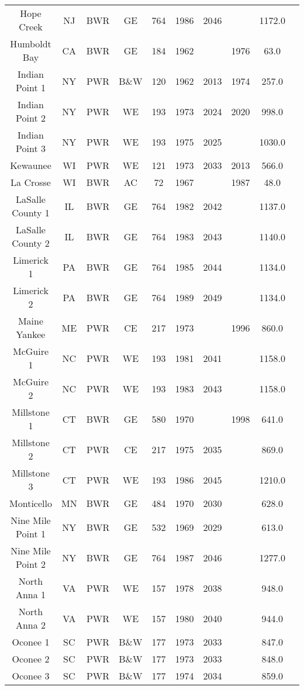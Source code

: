 \begin{table}[h!]
\begin{tabular}{c c c c c c c c c c}
    Hope Creek & NJ & BWR & GE & 764 & 1986 & 2046 &  & 1172.0 \\
    Humboldt Bay & CA & BWR & GE & 184 & 1962 &  & 1976 & 63.0 \\
    Indian Point 1 & NY & PWR & B\&W & 120 & 1962 & 2013 & 1974 & 257.0 \\
    Indian Point 2 & NY & PWR & WE & 193 & 1973 & 2024 & 2020 & 998.0 \\
    Indian Point 3 & NY & PWR & WE & 193 & 1975 & 2025 &  & 1030.0 \\
    Kewaunee & WI & PWR & WE & 121 & 1973 & 2033 & 2013 & 566.0 \\
    La Crosse & WI & BWR & AC & 72 & 1967 &  & 1987 & 48.0 \\
    LaSalle County 1 & IL & BWR & GE & 764 & 1982 & 2042 &  & 1137.0 \\
    LaSalle County 2 & IL & BWR & GE & 764 & 1983 & 2043 &  & 1140.0 \\
    Limerick 1 & PA & BWR & GE & 764 & 1985 & 2044 &  & 1134.0 \\
    Limerick 2 & PA & BWR & GE & 764 & 1989 & 2049 &  & 1134.0 \\
    Maine Yankee & ME & PWR & CE & 217 & 1973 &  & 1996 & 860.0 \\
    McGuire 1 & NC & PWR & WE & 193 & 1981 & 2041 &  & 1158.0 \\
    McGuire 2 & NC & PWR & WE & 193 & 1983 & 2043 &  & 1158.0 \\
    Millstone 1 & CT & BWR & GE & 580 & 1970 &  & 1998 & 641.0 \\
    Millstone 2 & CT & PWR & CE & 217 & 1975 & 2035 &  & 869.0 \\
    Millstone 3 & CT & PWR & WE & 193 & 1986 & 2045 &  & 1210.0 \\
    Monticello & MN & BWR & GE & 484 & 1970 & 2030 &  & 628.0 \\
    Nine Mile Point 1 & NY & BWR & GE & 532 & 1969 & 2029 &  & 613.0 \\
    Nine Mile Point 2 & NY & BWR & GE & 764 & 1987 & 2046 &  & 1277.0 \\
    North Anna 1 & VA & PWR & WE & 157 & 1978 & 2038 &  & 948.0 \\
    North Anna 2 & VA & PWR & WE & 157 & 1980 & 2040 &  & 944.0 \\
    Oconee 1 & SC & PWR & B\&W & 177 & 1973 & 2033 &  & 847.0 \\
    Oconee 2 & SC & PWR & B\&W & 177 & 1973 & 2033 &  & 848.0 \\
    Oconee 3 & SC & PWR & B\&W & 177 & 1974 & 2034 &  & 859.0 \\

\end{tabular}
\end{table}
